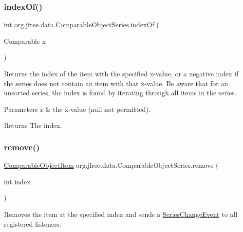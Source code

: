 \subsubsection{\texorpdfstring{index\+Of()}{indexOf()}}
{\footnotesize\ttfamily int org.\+jfree.\+data.\+Comparable\+Object\+Series.\+index\+Of (\begin{DoxyParamCaption}\item[{Comparable}]{x }\end{DoxyParamCaption})}

Returns the index of the item with the specified x-\/value, or a negative index if the series does not contain an item with that x-\/value. Be aware that for an unsorted series, the index is found by iterating through all items in the series.


\begin{DoxyParams}{Parameters}
{\em x} & the x-\/value ({\ttfamily null} not permitted).\\
\hline
\end{DoxyParams}
\begin{DoxyReturn}{Returns}
The index. 
\end{DoxyReturn}
\mbox{\label{classorg_1_1jfree_1_1data_1_1_comparable_object_series_a28c33382767491892419d3cc15891f68}} 
\subsubsection{\texorpdfstring{remove()}{remove()}\hspace{0.1cm}{\footnotesize\ttfamily [1/2]}}
{\footnotesize\ttfamily \mbox{\hyperlink{classorg_1_1jfree_1_1data_1_1_comparable_object_item}{Comparable\+Object\+Item}} org.\+jfree.\+data.\+Comparable\+Object\+Series.\+remove (\begin{DoxyParamCaption}\item[{int}]{index }\end{DoxyParamCaption})\hspace{0.3cm}{\ttfamily [protected]}}

Removes the item at the specified index and sends a \mbox{\hyperlink{}{Series\+Change\+Event}} to all registered listeners.


